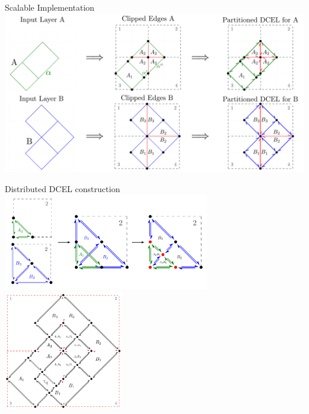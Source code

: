     \begin{frame}{Scalable Implementation}
        \centering
        \includegraphics[width=\textwidth]{../thesis/chapterSDCEL/partition_schema/PolygonsParted}
    \end{frame}

    \begin{frame}{Distributed DCEL construction}
        \centering
        \includegraphics[width=0.675\textwidth]{../thesis/chapterSDCEL/overlay_partition/overlay_partition} \\
        \includegraphics[width=0.390\textwidth]{../thesis/chapterSDCEL/distributed_dcel}
    \end{frame}

